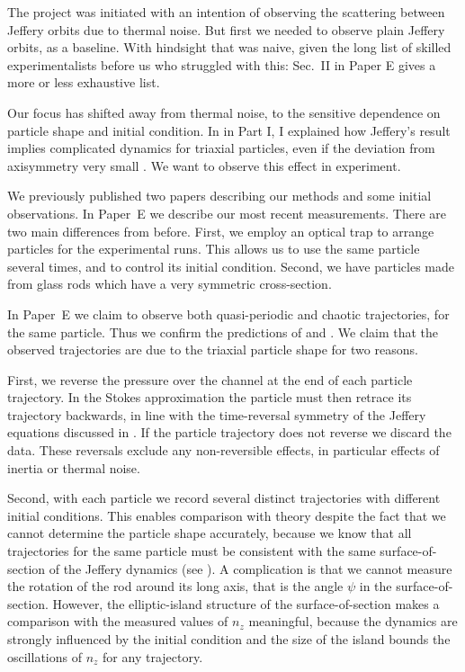 \documentclass[thesis.tex]{subfiles}
\begin{document}
The project was initiated with an intention of observing the scattering between Jeffery orbits due to thermal noise. But first we needed to observe plain Jeffery orbits, as a baseline. With hindsight that was naive, given the long list of skilled experimentalists before us who struggled with this: Sec.~II in Paper E gives a more or less exhaustive list. 

Our focus has shifted away from thermal noise, to the sensitive dependence on particle shape and initial condition. In  in Part I, I explained how Jeffery's result implies complicated dynamics for triaxial particles, even if the deviation from axisymmetry very small \cite{hinch1979,yarin1997}. We want to observe this effect in experiment.

We previously published two papers \cite{mishra2012,einarsson2013} describing our methods and some initial observations. In Paper~E we describe our most recent measurements. There are two main differences from before. First, we employ an optical trap to arrange particles for the experimental runs. This allows us to use the same particle several times, and to control its initial condition. Second, we have particles made from glass rods which have a very symmetric cross-section.

In Paper~E we claim to observe both quasi-periodic and chaotic trajectories, for the same particle. Thus we confirm the predictions of \citet{hinch1979} and \citet{yarin1997}. We claim that the observed trajectories are due to the triaxial particle shape for two reasons. 

First, we reverse the pressure over the channel at the end of each particle trajectory. In the Stokes approximation the particle must then retrace its trajectory backwards, in line with the time-reversal symmetry of the Jeffery equations discussed in . If the particle trajectory does not reverse we discard the data. These reversals exclude any non-reversible effects, in particular effects of inertia or thermal noise. 

Second, with each particle we record several distinct trajectories with different initial conditions. This enables comparison with theory despite the fact that we cannot determine the particle shape accurately, because we know that all trajectories for the same particle must be consistent with the same surface-of-section of the Jeffery dynamics (see ). A complication is that we cannot measure the rotation of the rod around its long axis, that is the angle $\psi$ in the surface-of-section. However, the elliptic-island structure of the surface-of-section makes a comparison with the measured values of $n_z$ meaningful, because the dynamics are strongly influenced by the initial condition and the size of the island bounds the oscillations of $n_z$ for any trajectory.
\end{document}
